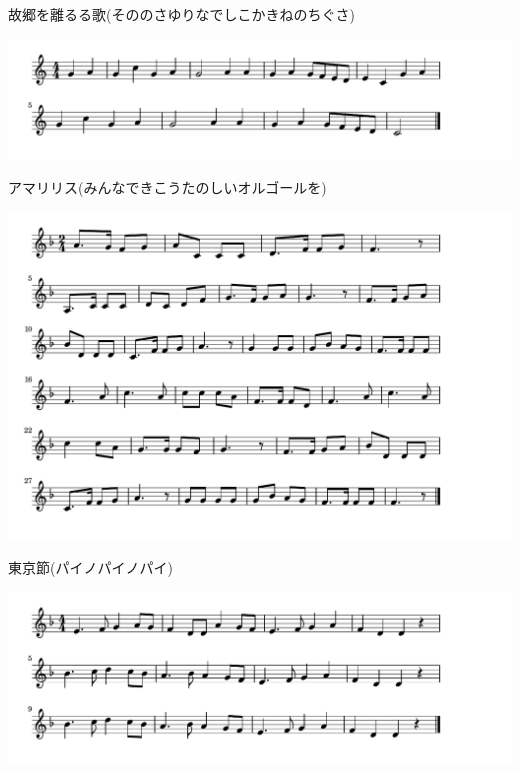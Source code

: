 \documentclass[a4paper]{ltjsarticle}
\begin{document}
\vspace{-10mm} \hspace{10mm}
故郷を離るる歌(そののさゆりなでしこかきねのちぐさ)

\includegraphics[clip]{amaryllis_crop.pdf}

\vspace{-10mm} \hspace{10mm}
アマリリス(みんなできこうたのしいオルゴールを)

\includegraphics[clip]{tokyobushi_crop.pdf}

\vspace{-10mm} \hspace{10mm}
東京節(パイノパイノパイ)

\includegraphics[clip]{korobeiniki_crop.pdf}
\end{document}
